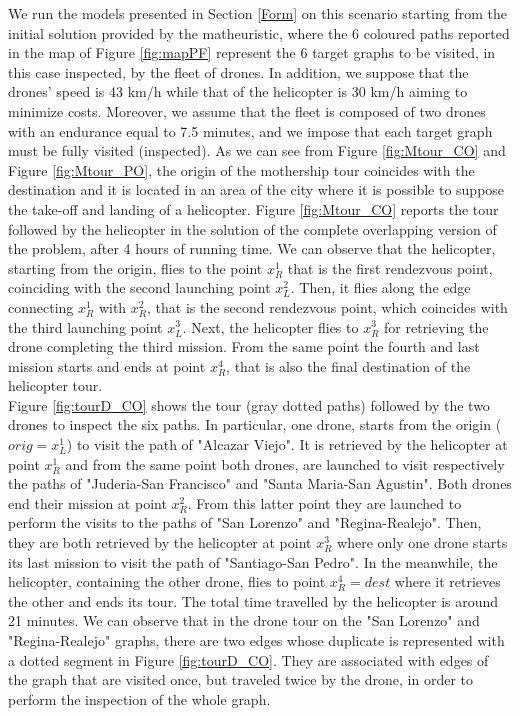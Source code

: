 \documentclass[10pt,a4paper]{elsarticle}
\newcommand{\EN}[1]{{\color{black}#1}}
\begin{document}
\noindent
We run the models presented in Section \ref{Form} on this scenario starting from the initial solution provided by the matheuristic, where the 6 coloured paths reported in the map of Figure \ref{fig:mapPF} represent the 6 target graphs to be visited, in this case inspected, by the fleet of drones. In addition, we suppose that the drones' speed is 43 km/h while that of the helicopter is  30 km/h aiming to minimize costs.
Moreover, we assume that the fleet is composed \EN{of} two drones with an endurance equal to 7.5 minutes, and we impose that each target graph must be fully visited (inspected).  As we can see from Figure \ref{fig:Mtour_CO} and Figure \ref{fig:Mtour_PO}, the origin of the mothership tour coincides with the destination and it is located in an area of the city where it is possible to \EN{suppose} the take-off and landing of \EN{a} helicopter. Figure \ref{fig:Mtour_CO} reports the tour followed by the helicopter in the solution of the complete overlapping version of the problem, after 4 hours of running time. We can observe that the helicopter, starting from the origin, flies to the point $x_R^1$ that is the first rendezvous point, coinciding with the second launching point $x_L^2$. Then, it flies along the edge connecting $x_R^1$ with $x_R^2$, that is the second rendezvous point, which coincides with the third launching point $x_L^3$. Next, the helicopter flies to $x_R^3$ for retrieving the \EN{drone completing the third mission}. From the same point the fourth and last mission starts and ends at point $x_R^4$, that is also the final destination of the helicopter tour.\\
Figure \ref{fig:tourD_CO} shows the tour (gray dotted paths) followed by the two drones \EN{to inspect} the six paths. In particular, one drone, starts from the origin ($orig=x_L^1$) \EN{to visit} the path of "Alcazar Viejo". It is retrieved by the helicopter at point $x_R^1$ and from the same point both drones, are launched to visit respectively the paths of "Juderia-San Francisco" and "Santa Maria-San Agustin". Both drones end their mission at point $x_R^2$. From this latter point they are launched to perform the visits to the paths of "San Lorenzo" and "Regina-Realejo". Then, they are both retrieved by the  helicopter at point $x_R^3$ where only one drone starts its last mission to visit the path of "Santiago-San Pedro". In the meanwhile, the helicopter, containing the other drone, flies to point $x_R^4=dest$ where it retrieves the other and ends its tour.
The total time travelled by the helicopter is around 21 minutes.
We can observe that in the drone tour on \EN{the} "San Lorenzo" and "Regina-Realejo" graphs, there are two edges whose duplicate is represented with a dotted segment in Figure \ref{fig:tourD_CO}. They are associated with edges of the graph that are visited once, but traveled twice by the drone, in order to perform the inspection of the whole graph.\\
\end{document}
